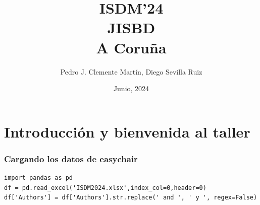 
\usepackage{arydshln}


\title[ISDM'24, JISBD, A Coruña]{ISDM'24\\JISBD\\A Coruña}

\author{Pedro J. Clemente Martín, Diego Sevilla Ruiz}
\date{Junio, 2024}



\def\insertsectionnumber{\arabic{section}}
\def\insertsubsectionnumber{\arabic{subsection}}



\begin{frame}
  \titlepage
\end{frame}

\section{Introducción y bienvenida al taller}



\begin{frame}[fragile]
\frametitle{Cargando los datos de easychair}

\begin{lstlisting}
import pandas as pd
df = pd.read_excel('ISDM2024.xlsx',index_col=0,header=0)
df['Authors'] = df['Authors'].str.replace(' and ', ' y ', regex=False)
\end{lstlisting}

\end{frame}

